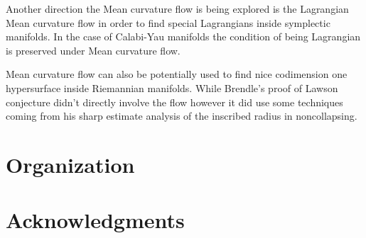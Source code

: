 Another direction the Mean curvature flow is being explored is the Lagrangian Mean curvature flow in order to find special Lagrangians inside symplectic manifolds. In the case of Calabi-Yau manifolds the condition of being Lagrangian is preserved under Mean curvature flow.

Mean curvature flow can also be potentially used to find nice codimension one hypersurface inside Riemannian manifolds. While Brendle's proof of Lawson conjecture didn't directly involve the flow however it did use some techniques coming from his sharp estimate analysis of the inscribed radius in noncollapsing. 

\section*{Organization}

\section*{Acknowledgments}